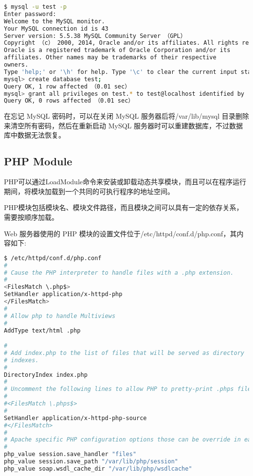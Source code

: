 \begin{lstlisting}[language=bash]
$ mysql -u test -p
Enter password:
Welcome to the MySQL monitor.
Your MySQL connection id is 43
Server version: 5.5.38 MySQL Community Server （GPL）
Copyright （c） 2000, 2014, Oracle and/or its affiliates. All rights reserved.
Oracle is a registered trademark of Oracle Corporation and/or its
affiliates. Other names may be trademarks of their respective
owners.
Type 'help;' or '\h' for help. Type '\c' to clear the current input statement.
mysql> create database test;
Query OK, 1 row affected （0.01 sec）
mysql> grant all privileges on test.* to test@localhost identified by 'p@ssw0rd';
Query OK, 0 rows affected （0.01 sec）
\end{lstlisting}


在忘记 MySQL 密码时，可以在关闭 MySQL 服务器后将/var/lib/mysql 目录删除来清空所有密码，然后在重新启动 MySQL 服务器时可以重建数据库，不过数据库中数据无法恢复。

\subsection{PHP Module}

PHP可以通过LoadModule命令来安装或卸载动态共享模块，而且可以在程序运行期间，将模块加载到一个共同的可执行程序的地址空间。

PHP模块包括模块名、模块文件路径，而且模块之间可以具有一定的依存关系，需要按顺序加载。

Web 服务器使用的 PHP 模块的设置文件位于/etc/httpd/conf.d/php.conf，其内容如下:


\begin{lstlisting}[language=bash]
$ /etc/httpd/conf.d/php.conf
#
# Cause the PHP interpreter to handle files with a .php extension.
#
<FilesMatch \.php$>
SetHandler application/x-httpd-php
</FilesMatch>
#
# Allow php to handle Multiviews
#
AddType text/html .php

#
# Add index.php to the list of files that will be served as directory
# indexes.
#
DirectoryIndex index.php
#
# Uncomment the following lines to allow PHP to pretty-print .phps files as PHP source code:
#
#<FilesMatch \.phps$>
#
SetHandler application/x-httpd-php-source
#</FilesMatch>
#
# Apache specific PHP configuration options those can be override in each configured vhost
#
php_value session.save_handler "files"
php_value session.save_path "/var/lib/php/session"
php_value soap.wsdl_cache_dir "/var/lib/php/wsdlcache"
\end{lstlisting}

